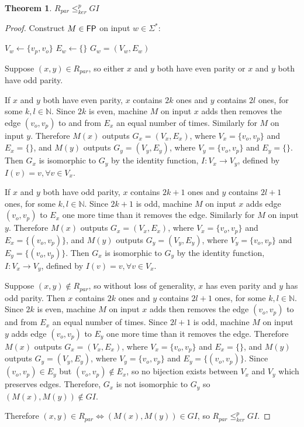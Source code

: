 \documentclass{article}
\newtheorem{theorem}{Theorem}%
\theoremstyle{definition}
\newcommand{\sigmastar}{\Sigma^{*}}
\newcommand{\kr}{\leq^{p}_{ker}} %
\begin{document}
\begin{theorem}\label{thm:rpar_gi}$R_{par}\kr GI$\end{theorem}
\begin{proof}
  Construct $M\in {\ensuremath{\mathsf{FP}}}$ on input $w\in\sigmastar$:\\
  \begin{algorithm}[H]
    $V_w\gets\{v_p, v_o\}$\;
    $E_w\gets\{\}$ \;
    \Return $G_w=(V_w, E_w)$
  \end{algorithm}

  Suppose $(x, y)\in R_{par}$, so either $x$ and $y$ both have even parity or
  $x$ and $y$ both have odd parity. 

  If $x$ and $y$ both have even parity, $x$ contains $2k$ ones and $y$ contains
  $2l$ ones, for some $k,l\in\mathbb{N}$. Since $2k$ is even, machine $M$ on
  input $x$ adds then removes the edge $(v_o, v_p)$ to and from $E_x$ an equal
  number of times. Similarly for $M$ on input $y$. Therefore $M(x)$ outputs
  $G_x=(V_x, E_x)$, where $V_x=\{v_o, v_p\}$ and $E_x=\{\}$, and $M(y)$ outputs
  $G_y=(V_y, E_y)$, where $V_y=\{v_o, v_p\}$ and $E_y=\{\}$. Then $G_x$ is
  isomorphic to $G_y$ by the identity function, $I:V_x\to V_y$, defined by
  $I(v)=v, \forall v\in V_x$.

  If $x$ and $y$ both have odd parity, $x$ contains $2k+1$ ones and $y$
  contains $2l+1$ ones, for some $k,l\in\mathbb{N}$. Since $2k+1$ is odd,
  machine $M$ on input $x$ adds edge $(v_o, v_p)$ to $E_x$ one more time than
  it removes the edge. Similarly for $M$ on input $y$. Therefore $M(x)$ outputs
  $G_x=(V_x, E_x)$, where $V_x=\{v_o, v_p\}$ and $E_x=\{(v_o, v_p)\}$, and
  $M(y)$ outputs $G_y=(V_y, E_y)$, where $V_y=\{v_o, v_p\}$ and $E_y=\{(v_o,
  v_p)\}$. Then $G_x$ is isomorphic to $G_y$ by the identity function,
  $I:V_x\to V_y$, defined by $I(v)=v, \forall v\in V_x$.

  Suppose $(x, y)\notin R_{par}$, so without loss of generality, $x$ has even
  parity and $y$ has odd parity. Then $x$ contains $2k$ ones and $y$ contains
  $2l+1$ ones, for some $k,l\in\mathbb{N}$. Since $2k$ is even, machine $M$ on
  input $x$ adds then removes the edge $(v_o, v_p)$ to and from $E_x$ an equal
  number of times. Since $2l+1$ is odd, machine $M$ on input $y$ adds edge
  $(v_o, v_p)$ to $E_y$ one more time than it removes the edge. Therefore
  $M(x)$ outputs $G_x=(V_x, E_x)$, where $V_x=\{v_o, v_p\}$ and $E_x=\{\}$, and
  $M(y)$ outputs $G_y=(V_y, E_y)$, where $V_y=\{v_o, v_p\}$ and $E_y=\{(v_o,
  v_p)\}$. Since $(v_o, v_p)\in E_y$ but $(v_o, v_p)\notin E_x$, so no
  bijection exists between $V_x$ and $V_y$ which preserves edges. Therefore,
  $G_x$ is not isomorphic to $G_y$ so $(M(x), M(y))\notin GI$.

  Therefore $(x, y)\in R_{par} \iff (M(x), M(y)) \in GI$, so $R_{par} \kr GI$.
\end{proof}
\end{document}
